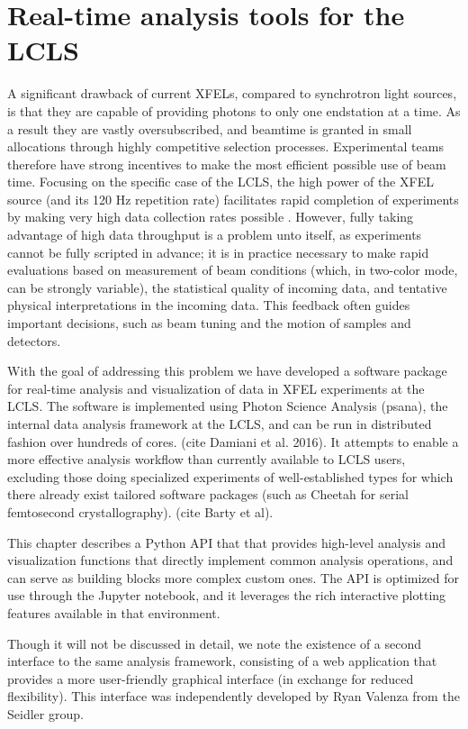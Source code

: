 \chapter{Real-time analysis tools for the LCLS}
\label{xap}

A significant drawback of current XFELs, compared to synchrotron light sources, is that they are capable of providing photons to only one endstation at a time. As a result they are vastly oversubscribed, and beamtime is granted in small allocations through highly competitive selection processes. Experimental teams therefore have strong incentives to make the most efficient possible use of beam time. Focusing on the specific case of the LCLS, the high power of the XFEL source (and its 120 Hz repetition rate) facilitates rapid completion of experiments by making very high data collection rates possible . However, fully taking advantage of high data throughput is a problem unto itself, as experiments cannot be fully scripted in advance; it is in practice necessary to make rapid evaluations based on measurement of beam conditions (which, in two-color mode, can be strongly variable), the statistical quality of incoming data, and tentative physical interpretations in the incoming data. This feedback often guides important decisions, such as beam tuning and the motion of samples and detectors. 

With the goal of addressing this problem we have developed a software package for real-time analysis and visualization of data in XFEL experiments at the LCLS. The software is implemented using Photon Science Analysis (psana), the internal data analysis framework at the LCLS, and can be run in distributed fashion over hundreds of cores. (cite Damiani et al. 2016). It attempts to enable a more effective analysis workflow than currently available to LCLS users, excluding those doing specialized experiments of well-established types for which there already exist tailored software packages (such as Cheetah for serial femtosecond crystallography). (cite Barty et al).

This chapter describes a Python API that that provides high-level analysis and visualization functions that directly implement common analysis operations, and can serve as building blocks more complex custom ones. The API is optimized for use through the Jupyter notebook, and it leverages the rich interactive plotting features available in that environment.

Though it will not be discussed in detail, we note the existence of a second interface to the same analysis framework, consisting of a web application that provides a more user-friendly graphical interface (in exchange for reduced flexibility). This interface was independently developed by Ryan Valenza from the Seidler group.



